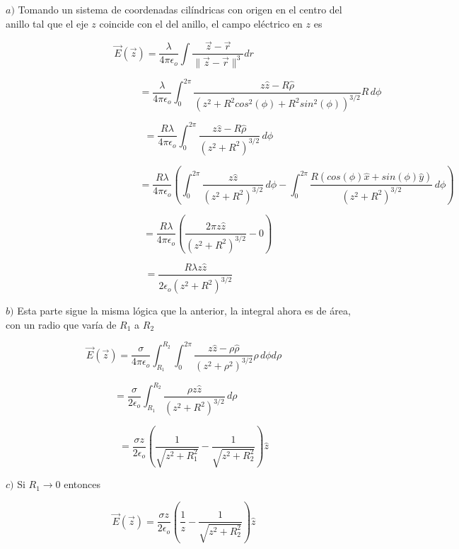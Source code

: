 \bigbreak
{}\newline

$a)$ Tomando un sistema de coordenadas cilíndricas con origen en el centro del anillo tal que el eje $z$ coincide con el del anillo, el campo eléctrico en $z$ es

\[\Vec{E}(\Vec{z}) = \frac{\lambda}{4\pi\epsilon_o}\int\frac{\Vec{z}-\Vec{r}}{\parallel
\Vec{z}-\Vec{r}\parallel^3}dr\]

\[\,\,\,\,\,\,\,\,\,\,\,\,\,\,\,\,\,\,\,\,\,\,\,\,\,\,\,\,\,\,\,\,\,\,\,\,\,\,\,\,\,\,\,\,\,\,\,\,\,\,\,\,\,\,\,\,\,\,\,\,\,\,\,\,\,\,\,\,\,\,\,\,\,\,\,\,\,\,\,\,\,= \frac{\lambda}{4\pi\epsilon_o}\int^{2\pi}_0\frac{z\hat{z}-R\hat{\rho}}{(z^2+R^2cos^2(\phi)+R^2sin^2(\phi))^{3/2}}R\,d\phi\]

\[\,\,\,\,\,\,\,\,\,\,\,\,\,\,\,\,\,\,\,\,\,\,\,\,\,\,\,\,\,\,= \frac{R\lambda}{4\pi\epsilon_o}\int^{2\pi}_0\frac{z\hat{z}-R\hat{\rho}}{(z^2+R^2)^{3/2}}\,d\phi\]

\[\,\,\,\,\,\,\,\,\,\,\,\,\,\,\,\,\,\,\,\,\,\,\,\,\,\,\,\,\,\,\,\,\,\,\,\,\,\,\,\,\,\,\,\,\,\,\,\,\,\,\,\,\,\,\,\,\,\,\,\,\,\,\,\,\,\,\,\,\,\,\,\,\,\,\,\,\,\,\,\,\,= \frac{R\lambda}{4\pi\epsilon_o}\left(
\int^{2\pi}_0\frac{z\hat{z}}{(z^2+R^2)^{3/2}}\,d\phi-
\int^{2\pi}_0\frac{R(cos(\phi)\hat{x}+sin(\phi)\hat{y})}{(z^2+R^2)^{3/2}}\,d\phi
\right)\]

\[\,\,\,\,\,\,\,\,\,\,\,\,\,\,\,\,\,\,\,\,\,\,\,\,\,\,\,\,\,= \frac{R\lambda}{4\pi\epsilon_o}\left(
\frac{2\pi z\hat{z}}{(z^2+R^2)^{3/2}}-0
\right)\]

\[\,\,\,\,\,\,= \frac{R\lambda z\hat{z}}{2\epsilon_o(z^2+R^2)^{3/2}}\]

\bigbreak

$b)$ Esta parte sigue la misma lógica que la anterior, la integral ahora es de área, con un radio que varía de $R_1$ a $R_2$

\[\Vec{E}(\Vec{z})= \frac{\sigma}{4\pi\epsilon_o}\int^{R_2}_{R_1}\int^{2\pi}_0\frac{z\hat{z}-\rho\hat{\rho}}{(z^2+\rho^2)^{3/2}}\rho\,d\phi d\rho\]

\[= \frac{\sigma}{2\epsilon_o}\int^{R_2}_{R_1}\frac{\rho z\hat{z}}{(z^2+R^2)^{3/2}}\,d\rho\,\,\,\,\,\,\,\,\,\, \]

\[\,\,\,\,\,\,\,\,\,\,\,\,= \frac{\sigma z}{2\epsilon_o}\left( 
\frac{1}{\sqrt{z^2+R_1^2}}-\frac{1}{\sqrt{z^2+R_2^2}}
\right)\hat{z}\]

\bigbreak

$c)$ Si $R_1 \longrightarrow 0$ entonces

\[\Vec{E}(\Vec{z}) = \frac{\sigma z}{2\epsilon_o}\left( 
\frac{1}{z}-\frac{1}{\sqrt{z^2+R_2^2}}
\right)\hat{z}\]

